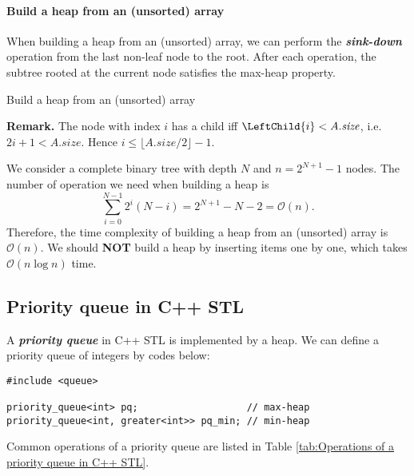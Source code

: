 \documentclass[12pt,a4paper]{ctexart}
\newcommand{\highlight}[1]{\textbf{\textit{#1}}}
\renewcommand{\leq}{\leqslant}
\begin{document}
    \paragraph{Build a heap from an (unsorted) array}

    When building a heap from an (unsorted) array, we can perform the \highlight{sink-down} operation from the last non-leaf node to the root. After each operation, the subtree rooted at the current node satisfies the max-heap property.

    \begin{algorithm}[!htbp]
        \caption{Build a heap from an (unsorted) array}
        \label{algo:Build a heap from an (unsorted) array}

    \end{algorithm}

    {\bf Remark. }The node with index $i$ has a child iff $\LeftChild{i} < A.\textit{size}$, i.e. $2i+1<A.\textit{size}$. Hence $i\leq\lfloor A.\textit{size}/2\rfloor-1$.

    We consider a complete binary tree with depth $N$ and $n=2^{N+1}-1$ nodes. The number of operation we need when building a heap is
    $$\sum_{i=0}^{N-1}2^i(N-i)=2^{N+1}-N-2=\mathcal O(n).$$
    Therefore, the time complexity of building a heap from an (unsorted) array is $\mathcal O(n)$. We should {\bf NOT} build a heap by inserting items one by one, which takes $\mathcal O(n\log n)$ time.

    \subsection{Priority queue in C++ STL}

    A \highlight{priority queue} in C++ STL is implemented by a heap. We can define a priority queue of integers by codes below:

    \begin{lstlisting}
#include <queue>

priority_queue<int> pq;                   // max-heap
priority_queue<int, greater<int>> pq_min; // min-heap
    \end{lstlisting}
    
    Common operations of a priority queue are listed in Table \ref{tab:Operations of a priority queue in C++ STL}.
\end{document}
